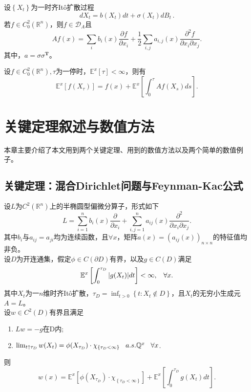 \documentclass[oneside]{sysuthesis}
\begin{document}
\begin{theorem}\label{theo:lemma_2}
	设$\left\{X_t\right\}$为一时齐It\^o扩散过程
	\[
	dX_t=b(X_t)dt+\sigma(X_t)dB_t\,.
	\]
	若$f\in C_0^2(\mathbb{R}^n)$，则$f\in\mathcal{D}_A$且
	\[
	Af(x)=\sum_ib_i(x)\frac{\partial f}{\partial x_i}+\frac{1}{2}\sum_{i,j}a_{i,j}(x)\frac{\partial^2f}{\partial x_i\partial x_j}.
	\]
	其中，$a=\sigma\sigma^{\mathbf{T}}$。
\end{theorem}

\begin{theorem}[Dynkin公式]\label{theo:Dynkin_formula}
	设$f\in C_0^2(\mathbb{R}^n),\tau$为一停时，$\mathbb{E}^x[\tau]<\infty$，则有
	\[
	\mathbb{E}^x[f(X_\tau)]=f(x)+\mathbb{E}^x\left[\int_{0}^{\tau}Af(X_s)ds\right].
	\]
\end{theorem}

\chapter{关键定理叙述与数值方法}\label{chap:3}

本章主要介绍了本文用到两个关键定理、用到的数值方法以及两个简单的数值例子。

\section{关键定理：混合Dirichlet问题与Feynman-Kac公式}

\begin{theorem}\label{theo:D-P_solution}
	设$L$为$C^2(\mathbb{R}^n)$上的半椭圆型偏微分算子，形式如下
	\[
	L=\sum_{i=1}^{n}b_i(x)\frac{\partial}{\partial x_i}+\sum_{i,j=1}^{n}a_{ij}(x)\frac{\partial^2}{\partial x_i\partial x_j}.
	\]
	其中$b_i$与$a_{ij}=a_{ji}$均为连续函数，且$\forall x$，矩阵$a(x)=(a_{ij}(x))_{n\times n}$的特征值均非负。\\
	\hspace*{2em}设$D$为开连通集，假定$\phi\in C(\partial D)$有界，以及$g\in C(D)$满足
	\[
	\mathbb{E}^x\left[\int_{0}^{\tau_D}|g(X_t)|dt\right]<\infty,\hspace{0.3cm}\forall x.
	\]
	其中$X_t$为一$n$维时齐It\^o扩散，$\tau_D=\inf_{t>0}\left\{t:X_t\notin D\right\}$，且$X_t$的无穷小生成元$A=L$。\\
	设$w\in C^2(D)$有界且满足
	\begin{enumerate}[label=(\arabic*)]
		\item $Lw=-g$\hspace{0.3cm}在D内;
		\item $\lim_{t\uparrow\tau_D}w(X_t)=\phi(X_{\tau_D})\cdot\chi_{\left\{\tau_D<\infty\right\}}\hspace{0.3cm}a.s.\mathbb{Q}^x\hspace{0.3cm}\forall x$.
	\end{enumerate}
	则
	\[
	w(x)=\mathbb{E}^x\left[\phi(X_{\tau_D})\cdot\chi_{\left\{\tau_D<\infty\right\}}\right]+\mathbb{E}^x\left[\int_{0}^{\tau_D}g(X_t)dt\right].
	\]
\end{theorem}
\end{document}
